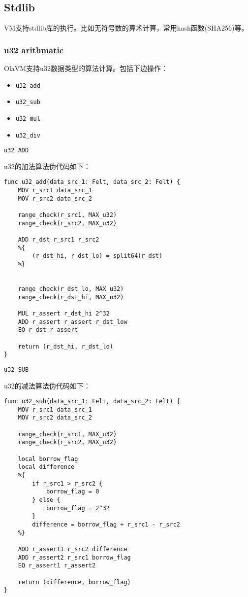\subsection{Stdlib}\label{subsec: : stdlib}
VM支持stdlib库的执行。比如无符号数的算术计算，常用hash函数(SHA256)等。
\subsubsection{u32 arithmatic}\label{subsec: u32-arithmatic}
OlaVM支持u32数据类型的算法计算。包括下边操作：
\begin{itemize}
    \item \verb|u32_add|
    \item \verb|u32_sub|
    \item \verb|u32_mul|
    \item \verb|u32_div|
\end{itemize}


\verb|u32 ADD|

u32的加法算法伪代码如下：

\begin{lstlisting}[language={}]
func u32_add(data_src_1: Felt, data_src_2: Felt) {
    MOV r_src1 data_src_1
    MOV r_src2 data_src_2

    range_check(r_src1, MAX_u32)
    range_check(r_src2, MAX_u32)

    ADD r_dst r_src1 r_src2
    %{
        (r_dst_hi, r_dst_lo) = split64(r_dst)
    %}


    range_check(r_dst_lo, MAX_u32)
    range_check(r_dst_hi, MAX_u32)

    MUL r_assert r_dst_hi 2^32
    ADD r_assert r_assert r_dst_low
    EQ r_dst r_assert

    return (r_dst_hi, r_dst_lo)
}
\end{lstlisting}


\verb|u32 SUB|

u32的减法算法伪代码如下：

\begin{lstlisting}[language={}]
func u32_sub(data_src_1: Felt, data_src_2: Felt) {
    MOV r_src1 data_src_1
    MOV r_src2 data_src_2

    range_check(r_src1, MAX_u32)
    range_check(r_src2, MAX_u32)

    local borrow_flag
    local difference
    %{
        if r_src1 > r_src2 {
            borrow_flag = 0
        } else {
            borrow_flag = 2^32
        }
        difference = borrow_flag + r_src1 - r_src2
    %}

    ADD r_assert1 r_src2 difference
    ADD r_assert2 r_src1 borrow_flag
    EQ r_assert1 r_assert2

    return (difference, borrow_flag)
}
\end{lstlisting}


